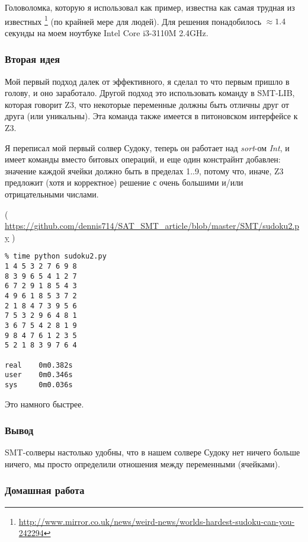 Головоломка, которую я использовал как пример, известна как самая трудная из известных
\footnote{\url{http://www.mirror.co.uk/news/weird-news/worlds-hardest-sudoku-can-you-242294}} (по крайней мере для людей).
Для решения понадобилось $\approx 1.4$ секунды на моем ноутбуке Intel Core i3-3110M 2.4GHz.

\subsubsection{Вторая идея}

Мой первый подход далек от эффективного, я сделал то что первым пришло в голову, и оно заработало.
Другой подход это использовать команду  в SMT-LIB, которая говорит Z3, что некоторые переменные
должны быть отличны друг от друга (или уникальны).
Эта команда также имеется в питоновском интерфейсе к Z3.

Я переписал мой первый солвер Судоку, теперь он работает над \textit{sort}-ом 
\textit{Int}, и имеет команды  вместо битовых операций,
и еще один констрайнт добавлен: значение каждой ячейки должно быть в пределах 1..9, потому что, иначе, Z3 предложит
(хотя и корректное) решение с очень большими и/или отрицательными числами.


( \url{https://github.com/dennis714/SAT_SMT_article/blob/master/SMT/sudoku2.py} )

\begin{lstlisting}
% time python sudoku2.py
1 4 5 3 2 7 6 9 8
8 3 9 6 5 4 1 2 7
6 7 2 9 1 8 5 4 3
4 9 6 1 8 5 3 7 2
2 1 8 4 7 3 9 5 6
7 5 3 2 9 6 4 8 1
3 6 7 5 4 2 8 1 9
9 8 4 7 6 1 2 3 5
5 2 1 8 3 9 7 6 4

real    0m0.382s
user    0m0.346s
sys     0m0.036s
\end{lstlisting}

Это намного быстрее.

\subsubsection{Вывод}

\ac{SMT}-солверы настолько удобны, что в нашем солвере Судоку нет ничего больше ничего, мы просто определили
отношения между переменными (ячейками).

\subsubsection{Домашная работа}

